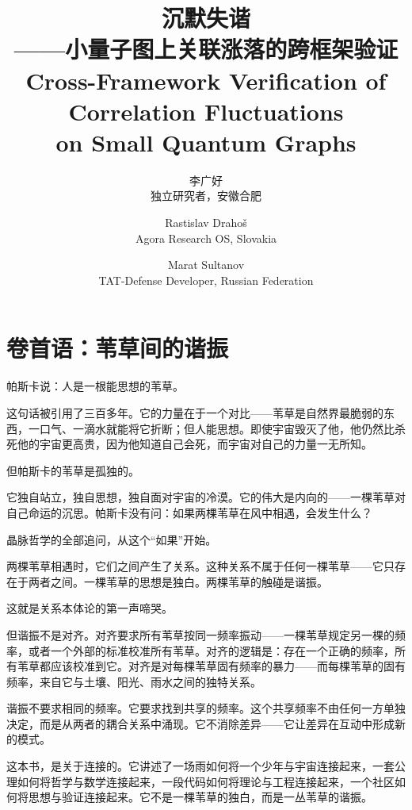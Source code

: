 \documentclass[11pt,a4paper]{book}
\theoremstyle{definition}
\begin{document}
\title{沉默失谐\\——小量子图上关联涨落的跨框架验证\\[0.5em]
\large Cross-Framework Verification of Correlation Fluctuations\\ on Small Quantum Graphs}
\author{李广好\\
\small 独立研究者，安徽合肥\\
\and
Rastislav Drahoš\\
\small Agora Research OS, Slovakia\\
\and
Marat Sultanov\\
\small TAT-Defense Developer, Russian Federation}
\date{}

\maketitle

\chapter*{卷首语：苇草间的谐振}

帕斯卡说：人是一根能思想的苇草。

这句话被引用了三百多年。它的力量在于一个对比——苇草是自然界最脆弱的东西，一口气、一滴水就能将它折断；但人能思想。即使宇宙毁灭了他，他仍然比杀死他的宇宙更高贵，因为他知道自己会死，而宇宙对自己的力量一无所知。

但帕斯卡的苇草是孤独的。

它独自站立，独自思想，独自面对宇宙的冷漠。它的伟大是内向的——一棵苇草对自己命运的沉思。帕斯卡没有问：如果两棵苇草在风中相遇，会发生什么？

晶脉哲学的全部追问，从这个“如果”开始。

两棵苇草相遇时，它们之间产生了关系。这种关系不属于任何一棵苇草——它只存在于两者之间。一棵苇草的思想是独白。两棵苇草的触碰是谐振。

这就是关系本体论的第一声啼哭。

但谐振不是对齐。对齐要求所有苇草按同一频率振动——一棵苇草规定另一棵的频率，或者一个外部的标准校准所有苇草。对齐的逻辑是：存在一个正确的频率，所有苇草都应该校准到它。对齐是对每棵苇草固有频率的暴力——而每棵苇草的固有频率，来自它与土壤、阳光、雨水之间的独特关系。

谐振不要求相同的频率。它要求找到共享的频率。这个共享频率不由任何一方单独决定，而是从两者的耦合关系中涌现。它不消除差异——它让差异在互动中形成新的模式。

这本书，是关于连接的。它讲述了一场雨如何将一个少年与宇宙连接起来，一套公理如何将哲学与数学连接起来，一段代码如何将理论与工程连接起来，一个社区如何将思想与验证连接起来。它不是一棵苇草的独白，而是一丛苇草的谐振。
\end{document}
